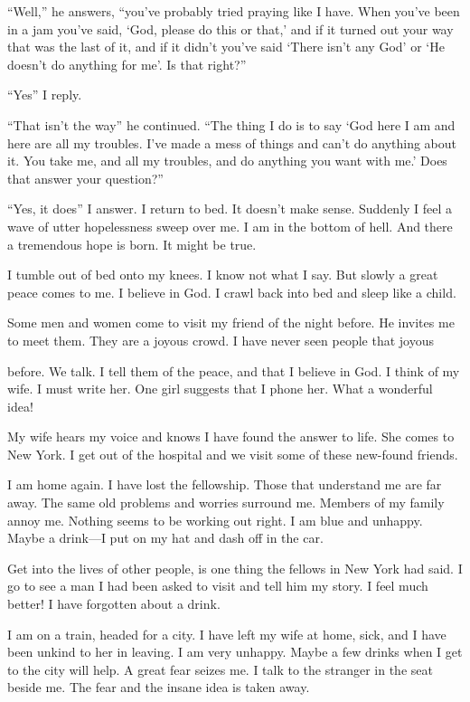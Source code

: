 \begin{biblechapter}
“Well,” he answers, “you’ve probably tried praying like I have. When you’ve been in a jam you’ve said, ‘God, please do this or that,’ and if it turned out your way that was the last of it, and if it didn’t you’ve said ‘There isn’t any God’ or ‘He doesn’t do anything for me’. Is that right?”

“Yes” I reply.

“That isn’t the way” he continued. “The thing I do is to say ‘God here I am and here are all my troubles. I’ve made a mess of things and can’t do anything about it. You take me, and all my troubles, and do anything you want with me.’ Does that answer your question?”

“Yes, it does” I answer. I return to bed. It doesn’t make sense. Suddenly I feel a wave of utter hopelessness sweep over me. I am in the bottom of hell. And there a tremendous hope is born. It might be true.

I tumble out of bed onto my knees. I know not what I say. But slowly a great peace comes to me. I believe in God. I crawl back into bed and sleep like a child.

Some men and women come to visit my friend of the night before. He invites me to meet them. They are a joyous crowd. I have never seen people that joyous

before. We talk. I tell them of the peace, and that I believe in God. I think of my wife. I must write her. One girl suggests that I phone her. What a wonderful idea!

My wife hears my voice and knows I have found the answer to life. She comes to New York. I get out of the hospital and we visit some of these new-found friends.

I am home again. I have lost the fellowship. Those that understand me are far away. The same old problems and worries surround me. Members of my family annoy me. Nothing seems to be working out right. I am blue and unhappy. Maybe a drink—I put on my hat and dash off in the car.

Get into the lives of other people, is one thing the fellows in New York had said. I go to see a man I had been asked to visit and tell him my story. I feel much better! I have forgotten about a drink.

I am on a train, headed for a city. I have left my wife at home, sick, and I have been unkind to her in leaving. I am very unhappy. Maybe a few drinks when I get to the city will help. A great fear seizes me. I talk to the stranger in the seat beside me. The fear and the insane idea is taken away.


\end{biblechapter}
